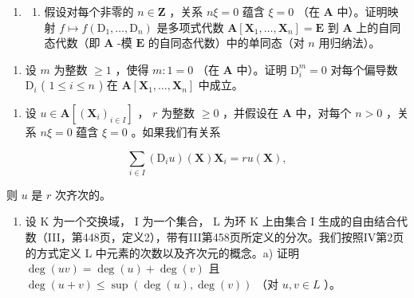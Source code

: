 \begin{enumerate}
\def\labelenumi{\arabic{enumi})}
\setcounter{enumi}{3}
\tightlist
\item
  \begin{enumerate}
  \def\labelenumii{\alph{enumii})}
  \tightlist
  \item
    假设对每个非零的 \(n \in \mathbf{Z}\) ，关系 \(n\xi = 0\) 蕴含 \(\xi = 0\) （在 \(\mathbf{A}\) 中）。证明映射 \(f \mapsto f(\mathrm{D}_1, \ldots, \mathrm{D}_n)\) 是多项式代数 \(\mathbf{A}[\mathbf{X}_1, \ldots, \mathbf{X}_n] = \mathbf{E}\) 到 \(\mathbf{A}\) 上的自同态代数（即 \(\mathbf{A}\) -模 \(\mathbf{E}\) 的自同态代数）中的单同态（对 \(n\) 用归纳法）。
  \end{enumerate}
\end{enumerate}

\begin{enumerate}
\def\labelenumi{\alph{enumi})}
\setcounter{enumi}{1}
\tightlist
\item
  设 \(m\) 为整数 \(\geqslant 1\) ，使得 \(m: 1 = 0\) （在 \(\mathbf{A}\) 中）。证明 \(\mathrm{D}_i^m = 0\) 对每个偏导数 \(\mathrm{D}_i\) ( \(1 \leqslant i \leqslant n\) ) 在 \(\mathbf{A}[\mathbf{X}_1, \ldots, \mathbf{X}_n]\) 中成立。
\end{enumerate}

\begin{enumerate}
\def\labelenumi{\arabic{enumi})}
\setcounter{enumi}{4}
\tightlist
\item
  设 \(u \in \mathbf{A}[(\mathbf{X}_i)_{i \in I}]\) ， \(r\) 为整数 \(\geqslant 0\) ，并假设在 \(\mathbf{A}\) 中，对每个 \(n > 0\) ，关系 \(n\xi = 0\) 蕴含 \(\xi = 0\) 。如果我们有关系
\end{enumerate}

\[
\sum_ {i \in I} \left(\mathrm{D} _ {i} u\right) (\mathbf {X}) \mathbf {X} _ {i} = r u (\mathbf {X}),
\]

则 \(u\) 是 \(r\) 次齐次的。

\begin{enumerate}
\def\labelenumi{\arabic{enumi})}
\setcounter{enumi}{5}
\tightlist
\item
  设 K 为一个交换域， I 为一个集合， L 为环 K 上由集合 I 生成的自由结合代数（III，第448页，定义2），带有III第458页所定义的分次。我们按照IV第2页的方式定义 L 中元素的次数以及齐次元的概念。a) 证明 \(\deg(uv) = \deg(u) + \deg(v)\) 且 \(\deg(u + v) \leqslant \sup(\deg(u), \deg(v))\) （对 \(u, v \in L\) ）。
\end{enumerate}

